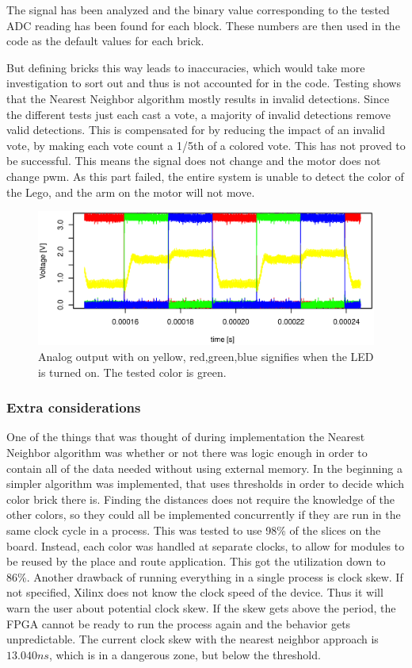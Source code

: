 The signal has been analyzed and the binary value corresponding to the tested ADC reading has been found for each block.
These numbers are then used in the code as the default values for each brick.

But defining bricks this way leads to inaccuracies, which would take more investigation to sort out and thus is not accounted for in the code.
Testing shows that the Nearest Neighbor algorithm mostly results in invalid detections.
Since the different tests just each cast a vote, a majority of invalid detections remove valid detections.
This is compensated for by reducing the impact of an invalid vote, by making each vote count a 1/5th of a colored vote.
This has not proved to be successful.
This means the signal does not change and the motor does not change pwm.
As this part failed, the entire system is unable to detect the color of the Lego, and the arm on the motor will not move. 

\begin{figure}[h]
\centering
 \includegraphics[width=0.9\linewidth]{img/analog_values}
 \caption[Analog output with all diodes.]{Analog output with on yellow, red,green,blue signifies when the LED is turned on. The tested color is green.}
 \label{fig:analog_values}
\end{figure}

\subsubsection{Extra considerations}
One of the things that was thought of during implementation the Nearest Neighbor algorithm was whether or not there was logic enough in order to contain all of the data needed without using external memory. In the beginning a simpler algorithm was implemented, that uses thresholds in order to decide which color brick there is.
Finding the distances does not require the knowledge of the other colors, so they could all be implemented concurrently if they are run in the same clock cycle in a process.
This was tested to use 98\% of the slices on the board.
Instead, each color was handled at separate clocks, to allow for modules to be reused by the place and route application.
This got the utilization down to 86\%.
Another drawback of running everything in a single process is clock skew.
If not specified, Xilinx does not know the clock speed of the device.
Thus it will warn the user about potential clock skew.
If the skew gets above the period, the FPGA cannot be ready to run the process again and the behavior gets unpredictable.
The current clock skew with the nearest neighbor approach is $13.040 ns$, which is in a dangerous zone, but below the threshold. 

